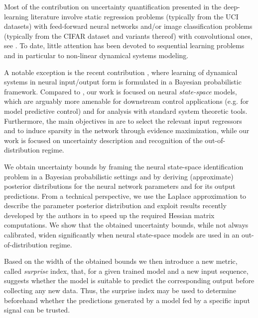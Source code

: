\documentclass{ifacconf}
\begin{document}
Most of the contribution on uncertainty quantification presented in the deep-learning literature involve static regression problems (typically from the UCI datasets) with feed-forward neural networks and/or image classification problems (typically from the CIFAR dataset and variants thereof) with convolutional ones, see \cite{maddox2019simple, wilson2020bayesian, izmailov2021bayesian}. To date, little attention has been devoted to sequential learning problems and in particular 
to non-linear dynamical systems modeling.

A notable exception is the recent contribution \cite{zhou2022sparse}, where learning of dynamical systems in neural input/output form is formulated  
in a Bayesian probabilistic framework. Compared to \cite{zhou2022sparse}, our work is focused on neural \emph{state-space} models, which are arguably more amenable for downstream control applications (e.g. for model predictive control) and for analysis with standard system theoretic tools. Furthermore, the main objectives in \cite{zhou2022sparse} are to select the relevant input regressors and to induce sparsity in the network through evidence maximization, while our work is focused on uncertainty description and recognition of the out-of-distribution regime. 

We obtain uncertainty bounds by framing the neural state-space identification problem in a Bayesian probabilistic settings and by deriving 
(approximate) posterior distributions for the neural network parameters and for its output predictions.
From a technical perspective, we use the Laplace approximation \cite{bishop2006pattern} to describe the parameter posterior distribution and exploit results recently developed by the authors in \cite{forgione2022adaptation} to speed up the required Hessian matrix computations.
We show that the obtained uncertainty bounds, while not always calibrated, widen significantly when neural state-space models are used in an out-of-distribution regime. 

Based on the width of the obtained bounds we then introduce a new metric, called \emph{surprise} index, that, for a given trained model and a {new} input sequence, suggests whether the model is suitable to predict the corresponding output before collecting any new data. 
Thus, the surprise index may be used to determine beforehand whether the predictions generated by a model fed by a specific input
signal can be trusted.
\end{document}

